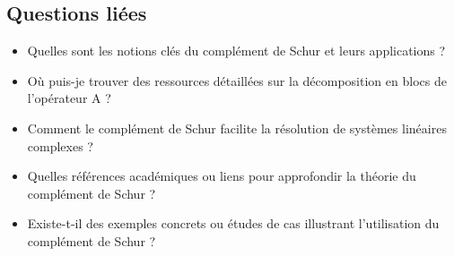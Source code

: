 \documentclass[12pt,a4paper]{article}
\begin{document}
	\subsection{Questions liées} %
	\begin{itemize}
		\item Quelles sont les notions clés du complément de Schur et leurs applications ?
		\item Où puis-je trouver des ressources détaillées sur la décomposition en blocs de l'opérateur A ?
		\item Comment le complément de Schur facilite la résolution de systèmes linéaires complexes ?
		\item Quelles références académiques ou liens pour approfondir la théorie du complément de Schur ?
		\item Existe-t-il des exemples concrets ou études de cas illustrant l'utilisation du complément de Schur ?
	\end{itemize}
	
\end{document}
